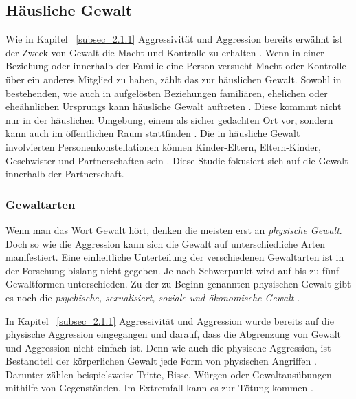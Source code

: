 \subsection{Häusliche Gewalt}    \label{subsec_2.1.2}
Wie in Kapitel ~\ref{subsec_2.1.1} Aggressivität und Aggression bereits erwähnt ist der Zweck von Gewalt die Macht und Kontrolle zu erhalten \parencite{Def_Aggressivität_vs_violence}. Wenn in einer Beziehung oder innerhalb der Familie eine Person versucht Macht oder Kontrolle über ein anderes Mitglied zu haben, zählt das zur häuslichen Gewalt. Sowohl in bestehenden, wie auch in aufgelösten Beziehungen familiären, ehelichen oder eheähnlichen Ursprungs kann häusliche Gewalt auftreten \parencite{Def_haus_Gewalt, Def_haus_Gewalt_2}. Diese kommmt nicht nur in der häuslichen Umgebung, einem als sicher gedachten Ort vor, sondern kann auch im öffentlichen Raum stattfinden \parencite{Gewaltarten_WHO}. Die in häusliche Gewalt involvierten Personenkonstellationen können Kinder-Eltern, Eltern-Kinder, Geschwister und Partnerschaften sein \parencite{Def_Form_Folge_Gewalt}. Diese Studie fokusiert sich auf die Gewalt innerhalb der Partnerschaft.

\subsubsection{Gewaltarten}     \label{2.1.2.1}
Wenn man das Wort Gewalt hört, denken die meisten erst an \textit{physische Gewalt}. Doch so wie die Aggression kann sich die Gewalt auf unterschiedliche Arten manifestiert. Eine einheitliche Unterteilung der verschiedenen Gewaltarten ist in der Forschung bislang nicht gegeben. Je nach Schwerpunkt wird auf bis zu fünf Gewaltformen unterschieden. Zu der zu Beginn genannten physischen Gewalt gibt es noch die \textit{psychische, sexualisiert, soziale und ökonomische Gewalt} \parencite{Def_Form_Folge_Gewalt}.

In Kapitel ~\ref{subsec_2.1.1} Aggressivität und Aggression wurde bereits auf die physische Aggression eingegangen und darauf, dass die Abgrenzung von Gewalt und Aggression nicht einfach ist. Denn wie auch die physische Aggression, ist Bestandteil der körperlichen Gewalt jede Form von physischen Angriffen \parencite{ph_G_wie_aggro}. Darunter zählen beispielsweise Tritte, Bisse, Würgen oder Gewaltausübungen mithilfe von Gegenständen. Im Extremfall kann es zur Tötung kommen \parencite{Gewaltart, Def_haus_Gewalt, physische_Gewalt_wie_aggro, Def_Form_Folge_Gewalt}.

